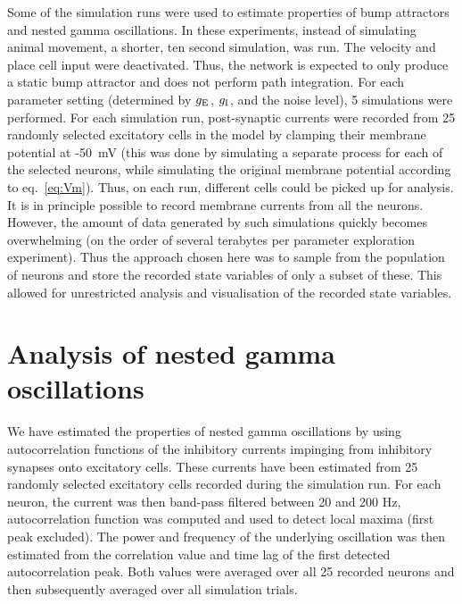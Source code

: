 \documentclass[a4paper,12pt]{article}
\newcommand{\ssc}[3]{\ensuremath{#1_{\text{#2}_{\text{#3}}}}}
\newcommand{\gE      }{\ssc{g}      {\scriptsize{E}}{}}
\newcommand{\gI      }{\ssc{g}      {\scriptsize{I}}{}}
\begin{document}
Some of the simulation runs were used to estimate properties of bump attractors
and nested gamma oscillations. 
In these experiments, instead of simulating animal movement, a shorter, ten
second simulation, was run. The velocity and place cell input were deactivated.
Thus, the network is expected to only produce a static bump attractor and does
not perform path integration. For each parameter setting (determined
by $\gE$, $\gI$, and the noise level), 5 simulations were performed.  For each
simulation run, post-synaptic currents were recorded from 25 randomly selected
excitatory cells in the model by clamping their membrane potential at
-50~mV (this was done by simulating a separate process for each of the selected
neurons, while simulating the original membrane potential according to
eq.~\eqref{eq:Vm}).
Thus, on each run, different cells could be
picked up for analysis. It is in principle possible to record membrane currents
from all the neurons. However, the amount of data generated by such simulations
quickly becomes overwhelming (on the order of several terabytes per
parameter exploration experiment). Thus the approach chosen here was to sample from
the population of neurons and store the recorded state variables of only a
subset of these. This allowed for unrestricted analysis and visualisation of
the recorded state variables.


\section{Analysis of nested gamma oscillations}

We have estimated the properties of nested gamma oscillations by using
autocorrelation functions of the inhibitory currents impinging from inhibitory
synapses onto excitatory cells. These currents have been estimated from 25
randomly selected excitatory cells recorded during the simulation run.
For each neuron, the current was then band-pass filtered between 20 and 200 Hz,
autocorrelation function was computed and used to detect local maxima (first
peak excluded). The power and frequency of the underlying oscillation was then
estimated from the correlation value and time lag of the first detected
autocorrelation peak. Both values were averaged over all 25 recorded neurons
and then subsequently averaged over all simulation trials.
\end{document}
